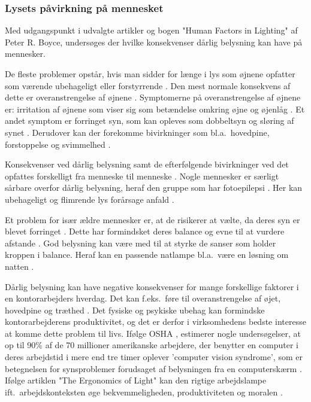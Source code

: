 \subsubsection{Lysets påvirkning på mennesket} 
\label{sec:konsekvenser}

Med udgangspunkt i udvalgte artikler og bogen "Human Factors in Lighting" af Peter R. Boyce, undersøges der hvilke konsekvenser dårlig belysning kan have på mennesker. 

De fleste problemer opstår, hvis man sidder for længe i lys som øjnene opfatter som værende ubehageligt eller forstyrrende \cite{human_factors}. Den mest normale konsekvens af dette er overanstrengelse af øjnene \cite{human_factors}. Symptomerne på overanstrengelse af øjnene er: irritation af øjnene som viser sig som betændelse omkring øjne og øjenlåg \cite{human_factors}. Et andet symptom er forringet syn, som kan opleves som dobbeltsyn og sløring af synet \cite{human_factors}. Derudover kan der forekomme bivirkninger som bl.a.\ hovedpine, forstoppelse og svimmelhed \cite{human_factors}.

Konsekvenser ved dårlig belysning samt de efterfølgende bivirkninger ved det opfattes forskelligt fra menneske til menneske \cite{human_factors}. Nogle mennesker er særligt sårbare overfor dårlig belysning, heraf den gruppe som har fotoepilepsi \cite{human_factors}. Her kan ubehageligt og flimrende lys forårsage anfald \cite{human_factors}. 

Et problem for især ældre mennesker er, at de risikerer at vælte, da deres syn er blevet forringet \cite{human_factors}. Dette har formindsket deres balance og evne til at vurdere afstande \cite{human_factors}. God belysning kan være med til at styrke de sanser som holder kroppen i balance. Heraf kan en passende natlampe bl.a.\ være en løsning om natten \cite{human_factors}. 

Dårlig belysning kan have negative konsekvenser for mange forskellige faktorer i en kontorarbejders hverdag. Det kan f.eks.\ føre til overanstrengelse af øjet, hovedpine og træthed \cite{ergonomi_arbejdsplads}. Det fysiske og psykiske ubehag kan formindske kontorarbejderens produktivitet, og det er derfor i virksomhedens bedste interesse at komme dette problem til livs. Ifølge OSHA \cite{OSHA}, estimerer nogle undersøgelser, at op til 90\% af de 70 millioner amerikanske arbejdere, der benytter en computer i deres arbejdstid i mere end tre timer oplever 'computer vision syndrome', som er betegnelsen for synsproblemer forudsaget af belysningen fra en computerskærm \cite{CVS}. Ifølge artiklen "The Ergonomics of Light" kan den rigtige arbejdslampe ift.\ arbejdskonteksten øge bekvemmeligheden, produktiviteten og moralen \cite{ergonomi_arbejdsplads}. 
